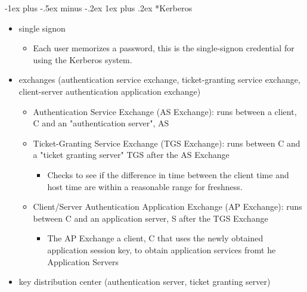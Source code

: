 \documentclass[3pt,landscape]{article}
\makeatletter
\renewcommand{\subsubsection}{\@startsection{subsubsection}{3}{0mm}%
                            {-1ex plus -.5ex minus -.2ex}%
                            {1ex plus .2ex}%
                            {\normalfont\small\bfseries}}
\makeatother
\begin{document}
\begin{multicols}{3}
\subsubsection*{Kerberos}
\begin{itemize}
    \item single signon
        \begin{itemize}
            \item Each user memorizes a password, this is the single-signon credential for using the Kerberos system.
        \end{itemize}
    \item exchanges (authentication service exchange, ticket-granting service exchange, client-server authentication application exchange)
        \begin{itemize}
            \item Authentication Service Exchange (AS Exchange): runs between a client, C and an "authentication server", AS
            \item Ticket-Granting Service Exchange (TGS Exchange): runs between C and a "ticket granting server" TGS after the AS Exchange
                \begin{itemize}
                    \item Checks to see if the difference in time between the client time and host time are within a reasonable range for freshness.
                \end{itemize}
            \item Client/Server Authentication Application Exchange (AP Exchange): runs between C and an application server, S after the TGS Exchange
                \begin{itemize}
                    \item The AP Exchange a client, C that uses the newly obtained application session key, to obtain application services fromt he Application Servers
                \end{itemize}
        \end{itemize}
    \item key distribution center (authentication server, ticket granting server)
\end{itemize}


\end{multicols}
\end{document}
